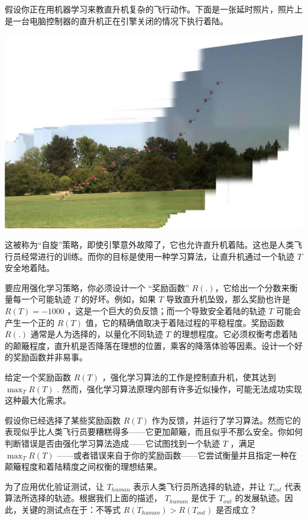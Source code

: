 假设你正在用机器学习来教直升机复杂的飞行动作。下面是一张延时照片，照片上是一台电脑控制器的直升机正在引擎关闭的情况下执行着陆。

\includegraphics{./img/ch46.jpg}

这被称为``自旋''策略，即使引擎意外故障了，它也允许直升机着陆。这也是人类飞行员经常进行的训练。而你的目标是使用一种学习算法，让直升机通过一个轨迹
\(T\) 安全地着陆。

要应用强化学习策略，你必须设计一个 ``奖励函数''
\(R(.)\)，它给出一个分数来衡量每一个可能轨迹 \(T\) 的好坏。例如，如果
\(T\) 导致直升机坠毁，那么奖励也许是 \(R(T)=-1000\)
，这是一个巨大的负反馈；而一个导致安全着陆的轨迹 \(T\)
可能会产生一个正的 \(R(T)\)
值，它的精确值取决于着陆过程的平稳程度。奖励函数 \(R(.)\)
通常是人为选择的，以量化不同轨迹 \(T\)
的理想程度。它必须权衡考虑着陆的颠簸程度，直升机是否降落在理想的位置，乘客的降落体验等因素。设计一个好的奖励函数并非易事。

给定一个奖励函数 \(R(T)\) ，强化学习算法的工作是控制直升机，使其达到
\(\max_TR(T)\) .
然而，强化学习算法原理内部有许多近似操作，可能无法成功实现这种最大化需求。

假设你已经选择了某些奖励函数 \(R(T)\)
作为反馈，并运行了学习算法。然而它的表现似乎比人类飞行员要糟糕得多------它更加颠簸，而且似乎不那么安全。你如何判断错误是否由强化学习算法造成------它试图找到一个轨迹
\(T\) ，满足 \(\max_TR(T)\)
------或者错误来自于你的奖励函数------它尝试衡量并且指定一种在颠簸程度和着陆精度之间权衡的理想结果。

为了应用优化验证测试，让 \(T_{human}\) 表示人类飞行员所选择的轨迹，并让
\(T_{out}\) 代表算法所选择的轨迹。根据我们上面的描述， \(T_{human}\)
是优于 \(T_{out}\) 的发展轨迹。因此，关键的测试点在于：不等式
\(R(T_{human}) \gt R(T_{out})\) 是否成立？

